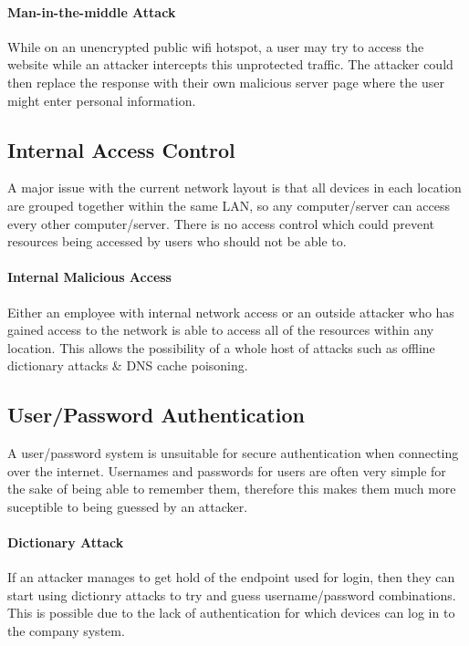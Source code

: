 \documentclass[11pt]{article}
\begin{document}
      \paragraph{Man-in-the-middle Attack} %
        While on an unencrypted public wifi hotspot, a user may try to access the website while an attacker intercepts this unprotected traffic. The attacker could then replace the response with their own malicious server page where the user might enter personal information.

    \subsection{Internal Access Control}
      A major issue with the current network layout is that all devices in each location are grouped together within the same LAN, so any computer/server can access every other computer/server. There is no access control which could prevent resources being accessed by users who should not be able to.

      \paragraph{Internal Malicious Access}
        Either an employee with internal network access or an outside attacker who has gained access to the network is able to access all of the resources within any location. This allows the possibility of a whole host of attacks such as offline dictionary attacks \& DNS cache poisoning.

    \subsection{User/Password Authentication}
      A user/password system is unsuitable for secure authentication when connecting over the internet. Usernames and passwords for users are often very simple for the sake of being able to remember them, therefore this makes them much more suceptible to being guessed by an attacker.

      \paragraph{Dictionary Attack} %
        If an attacker manages to get hold of the endpoint used for login, then they can start using dictionry attacks to try and guess username/password combinations. This is possible due to the lack of authentication for which devices can log in to the company system.
\end{document}
